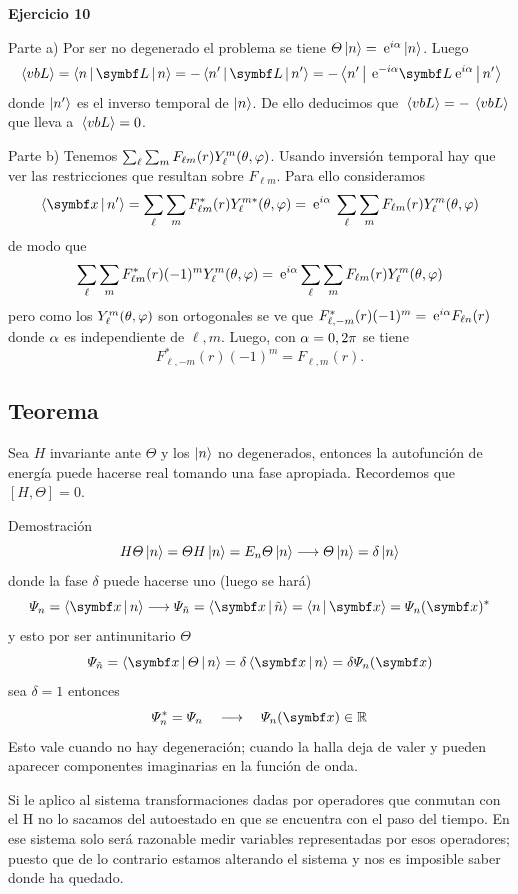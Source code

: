 \documentclass[10pt,oneside]{CBFT_book}
\begin{document}
\begin{ejemplo}{\bf Ejercicio 10}

Parte a) Por ser no degenerado el problema se tiene $\Theta\Ket{n} = \:\mathrm{e}^{i\alpha} \Ket{n}$. Luego
\[
	\vm{vb L} = \Braket{n|\vb L| n} = - \Braket{n'|\vb L|n'} = - \Braket{n'|\euler^{-i\a} \vb L \euler^{i\a} |n'}
\]
donde $\Ket{n'}$ es el inverso temporal de $\Ket{n}$.
De ello deducimos que $ \:\left\langle vb L \right\rangle = - \:\left\langle vb L \right\rangle $ que lleva a $\:\left\langle vb L \right\rangle =0$.

Parte b)
Tenemos $ \sum_\ell \sum_m F_{\ell m}(r) Y_\ell^m (\theta,\varphi)$. Usando inversión temporal hay que ver las
restricciones que resultan sobre $F_{\ell m}$. Para ello consideramos
\[
	\Braket{\vbx | n'} = \sum_\ell \sum_m F_{\ell m}^*(r) Y_\ell^{m*} (\theta,\vp) =
	\euler^{i\a} \: \sum_\ell \sum_m F_{\ell m} (r) Y_\ell^m (\theta,\vp)
\]
de modo que 
\[
	\sum_\ell \sum_m F_{\ell m}^*(r) (-1)^m Y_\ell^m (\theta,\varphi) =
	\:\mathrm{e}^{i\alpha} \sum_\ell \sum_m F_{\ell m} (r) Y_\ell^m (\theta,\varphi)
\]
pero como los $Y_\ell^m (\theta,\varphi)$ son ortogonales se ve que 
$ F^*_{\ell,-m}(r)(-1)^m = \:\mathrm{e}^{i\alpha} F_{\ell n}(r) $ donde $\alpha$ es independiente de $\ell,m$. Luego, con $\alpha=0,2\pi$
se tiene
\[
	F^*_{\ell,-m}(r)(-1)^m = F_{\ell,m}(r) .
\]

\end{ejemplo}


\subsection{Teorema}

Sea $H$ invariante ante $\Theta$ y los $\Ket{n}$ no degenerados, entonces la autofunción de energía puede 
hacerse real tomando una fase apropiada.
Recordemos que $[H,\Theta]=0$.

Demostración 
\[
	H\Theta\Ket{n} = \Theta H \Ket{n} = E_n \Theta \Ket{n} \longrightarrow \Theta \Ket{n} = \delta\Ket{n}
\]
donde la fase $\delta$ puede hacerse uno (luego se hará)
\[
	\Psi_n = \Braket{\vb{x}|n} \longrightarrow \Psi_{\tilde{n}} = \Braket{\vb{x}|\tilde{n}} =
	\Braket{n|\vb{x}} = \Psi_n (\vb{x})^*
\]
y esto por ser antinunitario $\Theta$
\[
	\Psi_{\tilde{n}} = \Braket{\vb{x}|\Theta|n} = \delta\Braket{\vb{x}|n} = \delta\Psi_n(\vb{x})
\]
sea $\delta = 1 $ entonces 
\[
	\Psi_n^* = \Psi_n \quad \longrightarrow \quad \Psi_n(\vb{x}) \in \mathbb{R} 
\]
Esto vale cuando no hay degeneración; cuando la halla deja de valer y pueden aparecer componentes
imaginarias en la función de onda.

Si le aplico al sistema transformaciones dadas por operadores que conmutan con el H no lo sacamos del 
autoestado en que se encuentra con el paso del tiempo.
En ese sistema solo será razonable medir variables representadas por esos operadores; puesto que de lo 
contrario estamos alterando el sistema y nos es imposible saber donde ha quedado.
\end{document}
